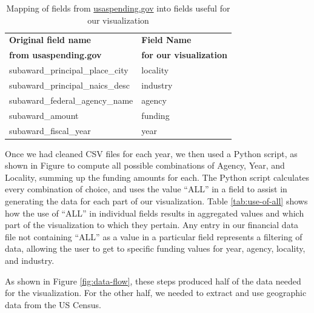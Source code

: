 \documentclass[10pt,journal,compsoc]{IEEEtran}
\begin{document}
\begin{table}[t]
\centering
\begin{tabular}{l | l}
\hline
\textbf{Original field name} & \textbf{Field Name} \\
\textbf{from usaspending.gov} & \textbf{for our visualization} \\ \hline
subaward\_principal\_place\_city         & locality                         \\
subaward\_principal\_naics\_desc         & industry                         \\
subaward\_federal\_agency\_name          & agency                           \\
subaward\_amount                         & funding                          \\
subaward\_fiscal\_year                   & year                                 \\ \hline
\end{tabular}
\caption{Mapping of fields from \protect\url{usaspending.gov} into fields useful for our visualization}
\label{tab:data-mapping}
\end{table}

Once we had cleaned CSV files for each year, we then used a Python script, as shown in Figure  to compute all possible combinations of Agency, Year, and Locality, summing up the funding amounts for each.  The Python script calculates every combination of choice, and uses the value ``ALL'' in a field to assist in generating the data for each part of our visualization.  Table \ref{tab:use-of-all} shows how the use of ``ALL'' in individual fields results in aggregated values and which part of the visualization to which they pertain.  Any entry in our financial data file not containing ``ALL'' as a value in a particular field represents a filtering of data, allowing the user to get to specific funding values for year, agency, locality, and industry.

As shown in Figure \ref{fig:data-flow}, these steps produced half of the data needed for the visualization.  For the other half, we needed to extract and use geographic data from the US Census.
\end{document}
